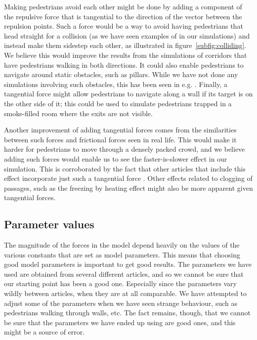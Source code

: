 Making pedestrians avoid each other might be done by adding a component of the 
repulsive force that is tangential to the direction of the vector between the 
repulsion points. Such a force would be a way to avoid having pedestrians that 
head straight for a collision (as we have seen examples of in our simulations) 
and instead make them sidestep each other, as illustrated in 
figure~\ref{subfig:colliding}. We believe this would improve the results from 
the simulations of corridors that have pedestrians walking in both directions. 
It could also enable pedestrians to navigate around static obstacles, such as 
pillars. While we have not done any simulations involving such obstacles, this 
has been seen in e.g. \cite{tang}. Finally, a tangential force might allow 
pedestrians to navigate along a wall if its target is on the other side of it; 
this could be used to simulate pedestrians trapped in a smoke-filled room 
where the exits are not visible.

Another improvement of adding tangential forces comes from the similarities 
between such forces and frictional forces seen in real life. This would make 
it harder for pedestrians to move through a densely packed crowd, and we 
believe adding such forces would enable us to see the faster-is-slower effect 
in our simulation. This is corroborated by the fact that other articles that 
include this effect incorporate just such a tangential force \cite{self-org}. 
Other effects related to clogging of passages, such as the freezing by heating 
effect might also be more apparent given tangential forces.


\subsection{Parameter values}
The magnitude of the forces in the model depend heavily on the values of the 
various constants that are set as model parameters. This means that choosing 
good model parameters is important to get good results. The parameters we have 
used are obtained from several different articles, and so we cannot be sure 
that our starting point has been a good one. Especially since the parameters 
vary wildly between articles, when they are at all comparable. We have 
attempted to adjust some of the parameters when we have seen strange 
behaviour, such as pedestrians walking through walls, etc. The fact remains, 
though, that we cannot be sure that the parameters we have ended up using are 
good ones, and this might be a source of error.

